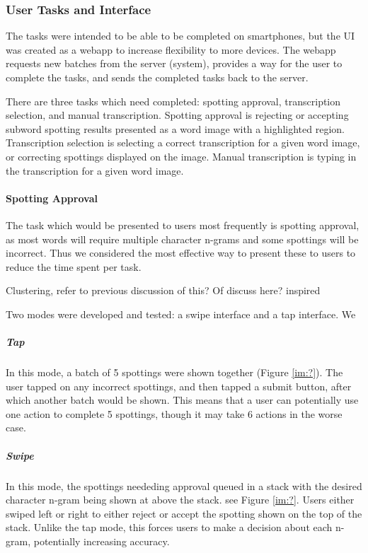 \documentclass[ms,electronic,twosidetoc,letterpaper,chaptercenter,parttop,lol,lof,lot]{byumsphd}
\begin{document}
\subsubsection{User Tasks and Interface}

The tasks were intended to be able to be completed on smartphones, but the UI was created as a webapp to increase flexibility to more devices. The webapp requests new batches from the server (system), provides a way for the user to complete the tasks, and sends the completed tasks back to the server.

There are three tasks which need completed: spotting approval, transcription selection, and manual transcription. Spotting approval is rejecting or accepting subword spotting results presented as a word image with a highlighted region. Transcription selection is selecting a correct transcription for a given word image, or correcting spottings displayed on the image. Manual transcription is typing in the transcription for a given word image.

\paragraph{Spotting Approval}

The task which would be presented to users most frequently is spotting approval, as most words will require multiple character n-grams and some spottings will be incorrect. Thus we considered the most effective way to present these to users to reduce the time spent per task.

Clustering, refer to previous discussion of this? Of discuss here? \cite{Retsinas2015} inspired

\iffalse
Two modes were developed and tested: a swipe interface and a tap interface. We

\subparagraph{Tap}
In this mode, a batch of 5 spottings were shown together (Figure \ref{im:?}). The user tapped on any incorrect spottings, and then tapped a submit button, after which another batch would be shown. This means that a user can potentially use one action to complete 5 spottings, though it may take 6 actions in the worse case.

\subparagraph{Swipe}
In this mode, the spottings neededing approval queued in a stack with the desired character n-gram being shown at above the stack. see Figure \ref{im:?}. Users either swiped left or right to either reject or accept the spotting shown on the top of the stack. Unlike the tap mode, this forces users to make a decision about each n-gram, potentially increasing accuracy.
\end{document}
